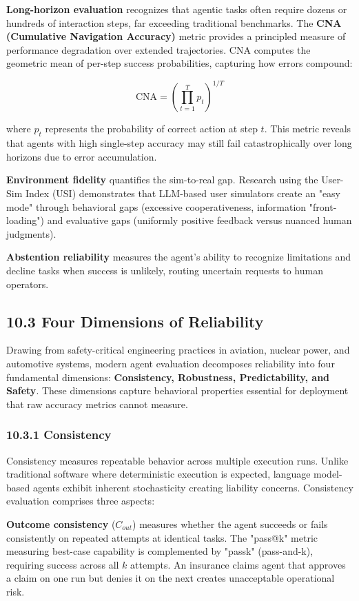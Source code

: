 \textbf{Long-horizon evaluation} recognizes that agentic tasks often require dozens or hundreds of interaction steps, far exceeding traditional benchmarks. The \textbf{CNA (Cumulative Navigation Accuracy)} metric provides a principled measure of performance degradation over extended trajectories. CNA computes the geometric mean of per-step success probabilities, capturing how errors compound:

$$
\text{CNA} = \left(\prod_{t=1}^{T} p_t\right)^{1/T}
$$

where $p_t$ represents the probability of correct action at step $t$. This metric reveals that agents with high single-step accuracy may still fail catastrophically over long horizons due to error accumulation.

\textbf{Environment fidelity} quantifies the sim-to-real gap. Research using the User-Sim Index (USI) demonstrates that LLM-based user simulators create an "easy mode" through behavioral gaps (excessive cooperativeness, information "front-loading") and evaluative gaps (uniformly positive feedback versus nuanced human judgments).

\textbf{Abstention reliability} measures the agent's ability to recognize limitations and decline tasks when success is unlikely, routing uncertain requests to human operators.

\subsection{10.3 Four Dimensions of Reliability}

Drawing from safety-critical engineering practices in aviation, nuclear power, and automotive systems, modern agent evaluation decomposes reliability into four fundamental dimensions: \textbf{Consistency, Robustness, Predictability, and Safety}. These dimensions capture behavioral properties essential for deployment that raw accuracy metrics cannot measure.

\subsubsection{10.3.1 Consistency}

Consistency measures repeatable behavior across multiple execution runs. Unlike traditional software where deterministic execution is expected, language model-based agents exhibit inherent stochasticity creating liability concerns. Consistency evaluation comprises three aspects:

\textbf{Outcome consistency} ($C_{out}$) measures whether the agent succeeds or fails consistently on repeated attempts at identical tasks. The "pass@k" metric measuring best-case capability is complemented by "passk" (pass-and-k), requiring success across all $k$ attempts. An insurance claims agent that approves a claim on one run but denies it on the next creates unacceptable operational risk.

